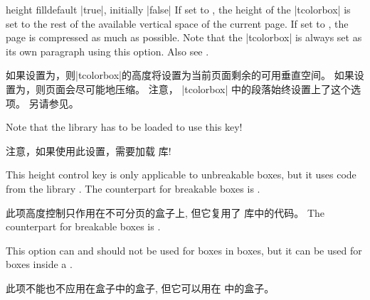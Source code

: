 \begin{docTcbKey}[][doc new and updated={2014-09-22}{2016-02-17}]{height fill}{}{default |true|, initially |false|}
If set to , the height of the |tcolorbox| is set to the rest of the
available vertical space of the current page.
If set to , the page is compressed as much as possible.
Note that the |tcolorbox|
is always set as its own paragraph using this option.
Also see .

如果设置为，则|tcolorbox|的高度将设置为当前页面剩余的可用垂直空间。 如果设置为，则页面会尽可能地压缩。 %
注意， |tcolorbox| 中的段落始终设置上了这个选项。
另请参见。

\begin{marker}
Note that the library  has to be loaded to use this key!

注意，如果使用此设置，需要加载  库!
\end{marker}
This height control key is only applicable to unbreakable boxes, but it
uses code from the library .
The counterpart for breakable boxes is .

此项高度控制只作用在不可分页的盒子上, 但它复用了  库中的代码。
The counterpart for breakable boxes is .

This option can and should not be used for boxes in boxes, but it can be
used for boxes inside a .

此项不能也不应用在盒子中的盒子, 但它可以用在  中的盒子。

\begin{dispListing}
\begin{tcolorbox}[height fill,
colback=red!5!white,colframe=red!75!black,fonttitle=\bfseries,
title=填充页面剩余部分的盒子]
\lipsum[1]
\end{tcolorbox}
\end{dispListing}
\end{docTcbKey}
{\tcbusetemp}




